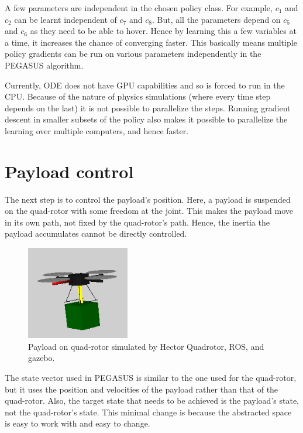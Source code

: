 \documentclass[hidelinks,BTech]{iitmdiss}
\begin{document}
A few parameters are independent in the chosen policy class. For example, $c_1$ and $c_2$ can be learnt independent of $c_7$ and $c_8$. But, all the parameters depend on $c_5$ and $c_6$ as they need to be able to hover. Hence by learning this a few variables at a time, it increases the chance of converging faster. This basically means multiple policy gradients can be run on various parameters independently in the PEGASUS algorithm.

Currently, ODE does not have GPU capabilities and so is forced to run in the CPU. Because of the nature of physics simulations (where every time step depends on the last) it is not possible to parallelize the steps. Running gradient descent in smaller subsets of the policy also makes it possible to parallelize the learning over multiple computers, and hence faster.

\section{Payload control}

The next step is to control the payload's position. Here, a payload is suspended on the quad-rotor with some freedom at the joint. This makes the payload move in its own path, not fixed by the quad-rotor's path. Hence, the inertia the payload accumulates cannot be directly controlled.

\begin{figure}[H]
  \centering
    \includegraphics[width=0.4\textwidth]{payload_sim.png}
    \caption{Payload on quad-rotor simulated by Hector Quadrotor, ROS, and gazebo.}
\end{figure}

The state vector used in PEGASUS is similar to the one used for the quad-rotor, but it uses the position and velocities of the payload rather than that of the quad-rotor. Also, the target state that needs to be achieved is the payload's state, not the quad-rotor's state. This minimal change is because the abstracted space is easy to work with and easy to change.
\end{document}
